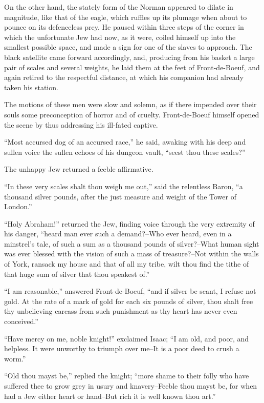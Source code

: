 On the other hand, the stately form of the Norman appeared to dilate in
magnitude, like that of the eagle, which ruffles up its plumage when
about to pounce on its defenceless prey. He paused within three steps of
the corner in which the unfortunate Jew had now, as it were, coiled
himself up into the smallest possible space, and made a sign for one of
the slaves to approach. The black satellite came forward accordingly,
and, producing from his basket a large pair of scales and several
weights, he laid them at the feet of Front-de-Boeuf, and again retired
to the respectful distance, at which his companion had already taken his
station.

The motions of these men were slow and solemn, as if there impended over
their souls some preconception of horror and of cruelty. Front-de-Boeuf
himself opened the scene by thus addressing his ill-fated captive.

``Most accursed dog of an accursed race,'' he said, awaking with his
deep and sullen voice the sullen echoes of his dungeon vault, ``seest
thou these scales?''

The unhappy Jew returned a feeble affirmative.

``In these very scales shalt thou weigh me out,'' said the relentless
Baron, ``a thousand silver pounds, after the just measure and weight of
the Tower of London.''

``Holy Abraham!'' returned the Jew, finding voice through the very
extremity of his danger, ``heard man ever such a demand?--Who ever
heard, even in a minstrel's tale, of such a sum as a thousand pounds of
silver?--What human sight was ever blessed with the vision of such a
mass of treasure?--Not within the walls of York, ransack my house and
that of all my tribe, wilt thou find the tithe of that huge sum of
silver that thou speakest of.''

``I am reasonable,'' answered Front-de-Boeuf, ``and if silver be scant,
I refuse not gold. At the rate of a mark of gold for each six pounds of
silver, thou shalt free thy unbelieving carcass from such punishment as
thy heart has never even conceived.''

``Have mercy on me, noble knight!'' exclaimed Isaac; ``I am old, and
poor, and helpless. It were unworthy to triumph over me--It is a poor
deed to crush a worm.''

``Old thou mayst be,'' replied the knight; ``more shame to their folly
who have suffered thee to grow grey in usury and knavery--Feeble thou
mayst be, for when had a Jew either heart or hand--But rich it is well
known thou art.''


